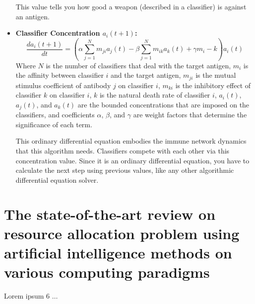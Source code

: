 \documentclass[12pt]{article} %
\begin{document}
\begin{itemize}
            This value tells you how good a weapon (described in a classifier) is against an antigen. 

        \item \textbf{Classifier Concentration $a_i(t+1)$: }
            \begin{equation}
                \frac{da_i(t+1)}{dt} = \left(
                    \alpha \sum^{N}_{j=1}m_{ji}a_j(t) - \beta\sum^{N}_{j=1}m_{ik}a_k(t) + \gamma m_i - k
                    \right) a_i(t)
            \end{equation}
            Where $N$ is the number of classifiers that deal with the target antigen, $m_i$ is the affinity between classifier $i$ and the target antigen, $m_{ji}$ is the mutual stimulus coefficient of antibody $j$ on classifier $i$, $m_{ki}$ is the inhibitory effect of classifier $k$ on classifier $i$, $k$ is the natural death rate of classifier $i$, $a_i(t)$, $a_j(t)$, and $a_k(t)$ are the bounded concentrations that are imposed on the classifiers, and coefficients $\alpha$, $\beta$, and $\gamma$ are weight factors that determine the significance of each term. 
            
            This ordinary differential equation embodies the immune network dynamics that this algorithm needs. Classifiers compete with each other via this concentration value. Since it is an ordinary differential equation, you have to calculate the next step using previous values, like any other algorithmic differential equation solver.  
    \end{itemize} 
    
    
\section*{The state-of-the-art review on resource allocation problem using artificial intelligence methods on various computing paradigms \cite{resourceAlloc_joloudari_2022}}
Lorem ipsum 6 $\ldots$




\end{document}
